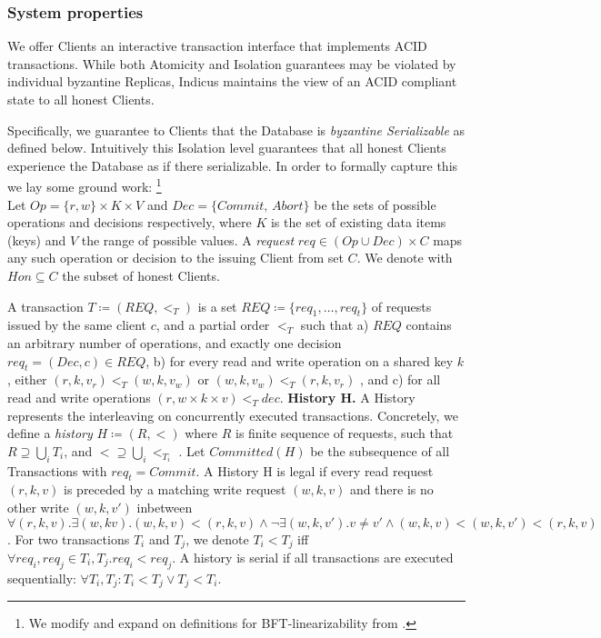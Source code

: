 \subsubsection{System properties}
We offer Clients an interactive transaction interface that implements ACID transactions. While both Atomicity and Isolation guarantees may be violated by individual byzantine Replicas, Indicus maintains the view of an ACID compliant state to all honest Clients. 

Specifically, we guarantee to Clients that the Database is \textit{byzantine Serializable} as defined below. Intuitively this Isolation level guarantees that all honest Clients experience the Database as if there serializable. In order to formally capture this we lay some ground work: \footnote{We modify and expand on definitions for BFT-linearizability from \cite{liskov2006tolerating}. }\\

Let $Op =  \{r, w\} \times K \times V $ and $Dec = \{Commit, \,Abort\}$ be the sets of possible operations and decisions respectively, where $K$ is the set of existing data items (keys) and $V$ the range of possible values. A \textit{request} $req \in (Op \cup Dec) \times C$ maps any such operation or decision to the issuing Client from set $C$. We denote with $Hon \subseteq C$ the subset of honest Clients. 

 
A transaction $T \coloneqq (REQ, <_T)$ is a set $REQ \coloneqq \{req_1, \dots, req_t \}$ of requests issued by the same client $c$, and a partial order $<_T$ such that a) $REQ$ contains an arbitrary number of operations, and exactly one decision $req_t = (Dec, c) \in REQ$, b) for every read and write operation on a shared key $k$, either $(r, k, v_r) <_T (w, k, v_w)$ or $(w, k, v_w) <_T (r, k, v_r)$ , and c) for all read and write operations $({r,w} \times k \times v) <_T dec$.
\textbf{History H.} A History represents the interleaving on concurrently executed transactions. Concretely, we define a \textit{history} $H \coloneqq (R, <)$ where $R$ is finite sequence of
requests, such that $R \supseteq \bigcup_i T_i$, and $< \supseteq \bigcup_i <_{T_i}$ .
Let $Committed(H)$ be the subsequence of all Transactions with $req_{t} = Commit$. A History H is legal if every read request $(r, k, v)$ is preceded by a matching write request $(w, k, v)$ and there is no other write $(w, k, v')$ inbetween  $\forall (r, k, v).\exists (w, k v). (w,k,v) < (r,k,v) \land \neg \exists (w, k, v'). v\neq v' \land (w, k,v) < (w,k, v') < (r, k, v)$. For two transactions $T_i$ and $T_j$, we denote $T_i < T_j$ iff $\forall req_i, req_j \in T_i, T_j. req_i < req_j$. A history is serial if all transactions are executed sequentially: $\forall T_i, T_j: T_i < T_j \lor T_j < T_i$.

